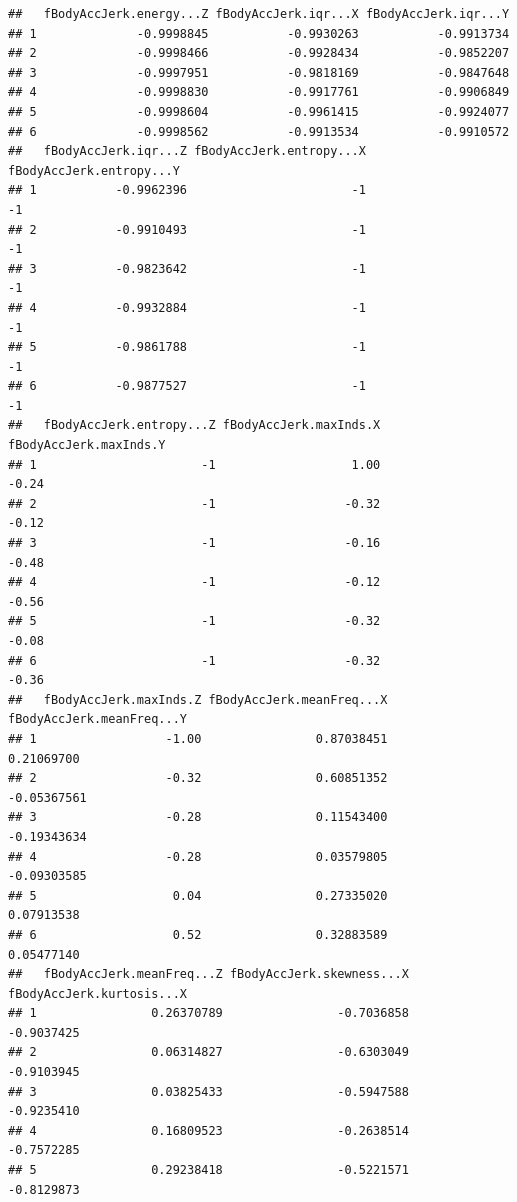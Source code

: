 \documentclass[
]{article}
\begin{document}
\begin{verbatim}
##   fBodyAccJerk.energy...Z fBodyAccJerk.iqr...X fBodyAccJerk.iqr...Y
## 1              -0.9998845           -0.9930263           -0.9913734
## 2              -0.9998466           -0.9928434           -0.9852207
## 3              -0.9997951           -0.9818169           -0.9847648
## 4              -0.9998830           -0.9917761           -0.9906849
## 5              -0.9998604           -0.9961415           -0.9924077
## 6              -0.9998562           -0.9913534           -0.9910572
##   fBodyAccJerk.iqr...Z fBodyAccJerk.entropy...X fBodyAccJerk.entropy...Y
## 1           -0.9962396                       -1                       -1
## 2           -0.9910493                       -1                       -1
## 3           -0.9823642                       -1                       -1
## 4           -0.9932884                       -1                       -1
## 5           -0.9861788                       -1                       -1
## 6           -0.9877527                       -1                       -1
##   fBodyAccJerk.entropy...Z fBodyAccJerk.maxInds.X fBodyAccJerk.maxInds.Y
## 1                       -1                   1.00                  -0.24
## 2                       -1                  -0.32                  -0.12
## 3                       -1                  -0.16                  -0.48
## 4                       -1                  -0.12                  -0.56
## 5                       -1                  -0.32                  -0.08
## 6                       -1                  -0.32                  -0.36
##   fBodyAccJerk.maxInds.Z fBodyAccJerk.meanFreq...X fBodyAccJerk.meanFreq...Y
## 1                  -1.00                0.87038451                0.21069700
## 2                  -0.32                0.60851352               -0.05367561
## 3                  -0.28                0.11543400               -0.19343634
## 4                  -0.28                0.03579805               -0.09303585
## 5                   0.04                0.27335020                0.07913538
## 6                   0.52                0.32883589                0.05477140
##   fBodyAccJerk.meanFreq...Z fBodyAccJerk.skewness...X fBodyAccJerk.kurtosis...X
## 1                0.26370789                -0.7036858                -0.9037425
## 2                0.06314827                -0.6303049                -0.9103945
## 3                0.03825433                -0.5947588                -0.9235410
## 4                0.16809523                -0.2638514                -0.7572285
## 5                0.29238418                -0.5221571                -0.8129873

\end{verbatim}
\end{document}
